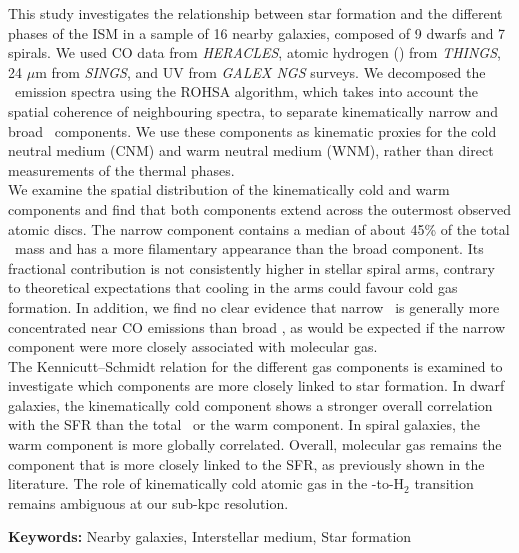 \vspace{-0.1em}
This study investigates the relationship between star formation and the different phases of the ISM in a sample of 16 nearby galaxies, composed of 9 dwarfs and 7 spirals. We used CO data from \textit{HERACLES}, atomic hydrogen (\HI) from \textit{THINGS}, 24 $\mu$m from \textit{SINGS}, and UV from \textit{GALEX NGS} surveys. We decomposed the \HI\ emission spectra using the ROHSA algorithm, which takes into account the spatial coherence of neighbouring spectra, to separate kinematically narrow and broad \HI\ components. We use these components as kinematic proxies for the cold neutral medium (CNM) and warm neutral medium (WNM), rather than direct measurements of the thermal phases.\\\indent
We examine the spatial distribution of the kinematically cold and warm components and find that both components extend across the outermost observed atomic discs. The narrow component contains a median of about 45\% of the total \HI\ mass and has a more filamentary appearance than the broad component. Its fractional contribution is not consistently higher in stellar spiral arms, contrary to theoretical expectations that cooling in the arms could favour cold gas formation. In addition, we find no clear evidence that narrow \HI\ is generally more concentrated near CO emissions than broad \HI, as would be expected if the narrow component were more closely associated with molecular gas.\\\indent
The Kennicutt--Schmidt relation for the different gas components is examined to investigate which components are more closely linked to star formation. In dwarf galaxies, the kinematically cold component shows a stronger overall correlation with the SFR than the total \HI\ or the warm component. In spiral galaxies, the warm component is more globally correlated. Overall, molecular gas remains the component that is more closely linked to the SFR, as previously shown in the literature. The role of kinematically cold atomic gas in the \HI-to-H$_2$ transition remains ambiguous at our sub-kpc resolution.

\noindent\textbf{Keywords:} Nearby galaxies, Interstellar medium, Star formation
\newpage